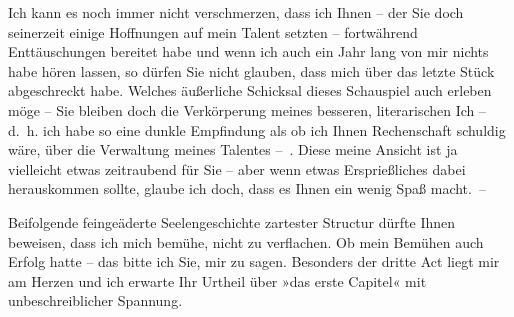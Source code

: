 \pstart
           {\pb}Ich kann es noch immer nicht verschmerzen, dass ich Ihnen – der Sie doch
               seinerzeit einige Hoffnungen auf mein Talent setzten – fortwährend Enttäuschungen
               bereitet habe und wenn ich auch ein Jahr lang von mir nichts habe hören lassen, so
               dürfen Sie nicht glauben, dass mich \label{K_L03723-1v}\label{K_L03723-1}
               über das letzte Stück
               abgeschreckt habe. Welches äußerliche Schicksal dieses Schauspiel auch erleben möge – Sie bleiben
               doch die Verkörperung meines besseren, literarischen Ich – d. h. ich habe so eine {\pb}dunkle Empfindung als ob ich Ihnen Rechenschaft schuldig wäre, über die
               Verwaltung meines Talentes – . Diese meine Ansicht ist ja vielleicht etwas zeitraubend für Sie – aber wenn etwas
               Ersprießliches dabei herauskommen sollte, glaube ich doch, dass es Ihnen ein wenig
               Spaß macht. –\pend
           
\pstart
           Beifolgende feingeäderte Seelengeschichte zartester Structur dürfte Ihnen beweisen, dass ich mich
               bemühe, nicht zu verflachen. Ob mein Bemühen auch {\pb}Erfolg hatte – das
               bitte ich Sie, mir zu sagen. Besonders der dritte Act liegt mir am Herzen und ich
               erwarte Ihr Urtheil über »das erste Capitel«
               mit unbeschreiblicher Spannung.\pend
           
